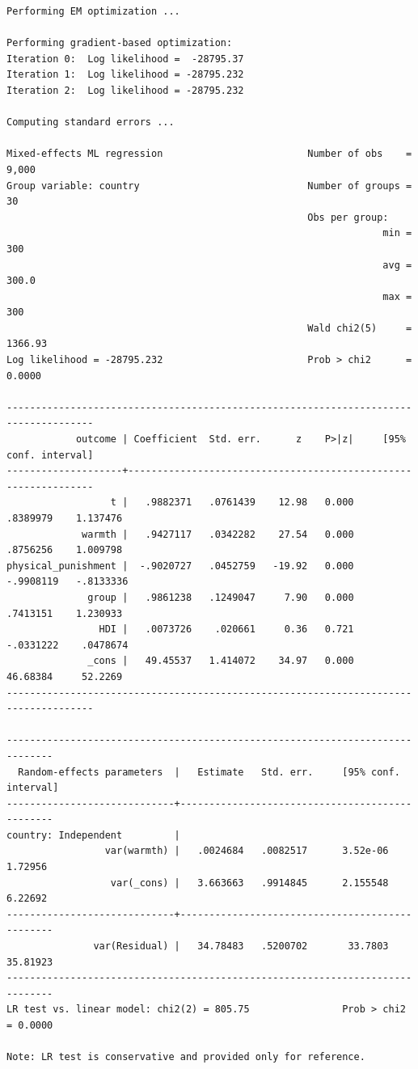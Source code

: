 \documentclass[
  letterpaper,
  DIV=11,
  numbers=noendperiod]{scrreprt}
\begin{document}
\begin{verbatim}
Performing EM optimization ...

Performing gradient-based optimization: 
Iteration 0:  Log likelihood =  -28795.37  
Iteration 1:  Log likelihood = -28795.232  
Iteration 2:  Log likelihood = -28795.232  

Computing standard errors ...

Mixed-effects ML regression                         Number of obs    =   9,000
Group variable: country                             Number of groups =      30
                                                    Obs per group:
                                                                 min =     300
                                                                 avg =   300.0
                                                                 max =     300
                                                    Wald chi2(5)     = 1366.93
Log likelihood = -28795.232                         Prob > chi2      =  0.0000

-------------------------------------------------------------------------------------
            outcome | Coefficient  Std. err.      z    P>|z|     [95% conf. interval]
--------------------+----------------------------------------------------------------
                  t |   .9882371   .0761439    12.98   0.000     .8389979    1.137476
             warmth |   .9427117   .0342282    27.54   0.000     .8756256    1.009798
physical_punishment |  -.9020727   .0452759   -19.92   0.000    -.9908119   -.8133336
              group |   .9861238   .1249047     7.90   0.000     .7413151    1.230933
                HDI |   .0073726    .020661     0.36   0.721    -.0331222    .0478674
              _cons |   49.45537   1.414072    34.97   0.000     46.68384     52.2269
-------------------------------------------------------------------------------------

------------------------------------------------------------------------------
  Random-effects parameters  |   Estimate   Std. err.     [95% conf. interval]
-----------------------------+------------------------------------------------
country: Independent         |
                 var(warmth) |   .0024684   .0082517      3.52e-06     1.72956
                  var(_cons) |   3.663663   .9914845      2.155548     6.22692
-----------------------------+------------------------------------------------
               var(Residual) |   34.78483   .5200702       33.7803    35.81923
------------------------------------------------------------------------------
LR test vs. linear model: chi2(2) = 805.75                Prob > chi2 = 0.0000

Note: LR test is conservative and provided only for reference.
\end{verbatim}
\end{document}
